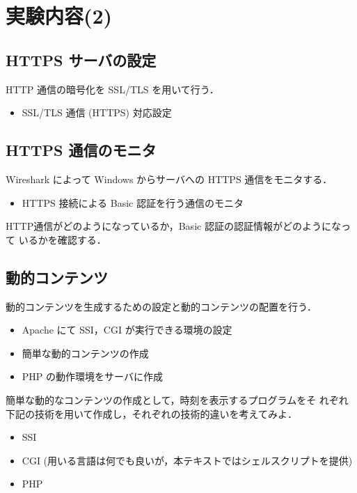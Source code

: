 \section{実験内容(2)}

\subsection{HTTPS サーバの設定}

HTTP 通信の暗号化を SSL/TLS を用いて行う．

\begin{itemize}
\item SSL/TLS 通信 (HTTPS) 対応設定
\end{itemize}

\subsection{HTTPS 通信のモニタ}

Wireshark によって Windows からサーバへの HTTPS 通信をモニタする．
\begin{itemize}
 \item HTTPS 接続による Basic 認証を行う通信のモニタ
\end{itemize}

HTTP通信がどのようになっているか，Basic 認証の認証情報がどのようになって
いるかを確認する．

\subsection{動的コンテンツ}

動的コンテンツを生成するための設定と動的コンテンツの配置を行う．
\begin{itemize}
\item Apache にて SSI，CGI が実行できる環境の設定
\item 簡単な動的コンテンツの作成
\item PHP の動作環境をサーバに作成
\end{itemize}

簡単な動的なコンテンツの作成として，時刻を表示するプログラムをそ
れぞれ下記の技術を用いて作成し，それぞれの技術的違いを考えてみよ．
\begin{itemize}
 \item SSI
 \item CGI (用いる言語は何でも良いが，本テキストではシェルスクリプトを提供)
 \item PHP
\end{itemize}

